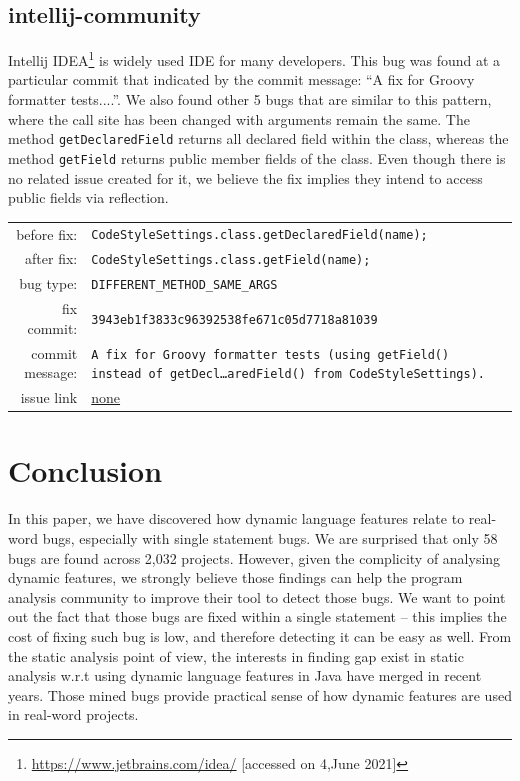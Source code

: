 \documentclass[sigconf,review,anonymous]{acmart}
\begin{document}
\subsection{intellij-community}
Intellij IDEA\footnote{\url{https://www.jetbrains.com/idea/} [accessed on 4,June 2021]} is widely used IDE for many developers. This bug was found at a particular commit that indicated by the commit message: ``A fix for Groovy formatter tests....''.  We also found other 5 bugs that are similar to this pattern, where the call site has been changed with arguments remain the same. The method \texttt{getDeclaredField} \cite{javaclassapi} returns all declared field within the class, whereas the method \texttt{getField} \cite{javaclassapi} returns public member fields of the class. Even though there is no related issue created for it, we believe the fix implies they intend to access public fields via reflection.
\begin{table}[h!]
  \footnotesize
  \label{tab:intellij}
  \begin{tabular}{rp{5cm}}
    before fix:  &  \footnotesize{\texttt{CodeStyleSettings.class.getDeclaredField(name);}} \\
    after fix:  &  \footnotesize{\texttt{CodeStyleSettings.class.getField(name);}} \\
    bug type:   &  \texttt{DIFFERENT\_METHOD\_SAME\_ARGS} \\
    fix commit: &  \texttt{3943eb1f3833c96392538fe671c05d7718a81039} \\
    commit message:   &  \texttt{A fix for Groovy formatter tests (using getField() instead of getDecl…aredField() from CodeStyleSettings).}\\
    issue link &  \url{none}
  \end{tabular}
\end{table}   

\section{Conclusion}

In this paper, we have discovered how dynamic language features relate to real-word bugs, especially with single statement bugs. We are surprised that only 58 bugs are found across 2,032 projects. However, given the complicity of analysing dynamic features, we strongly believe those findings can help the program analysis community to improve their tool to detect those bugs.  We want to point out the fact that those bugs are fixed within a single statement -- this implies the cost of fixing such bug is low, and therefore detecting it can be easy as well. From the static analysis point of view, the interests in finding gap exist in static analysis \cite{sui2020recall} w.r.t using dynamic language features in Java have merged in recent years.  Those mined bugs provide practical sense of how dynamic features are used in real-word projects.
\end{document}
